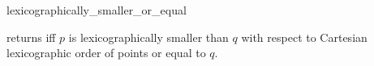 \begin{ccRefFunction}{lexicographically_smaller_or_equal}

{returns  iff $p$ is lexicographically smaller
 than $q$ with respect to Cartesian lexicographic 
 order of points or equal to $q$.}

\end{ccRefFunction}

